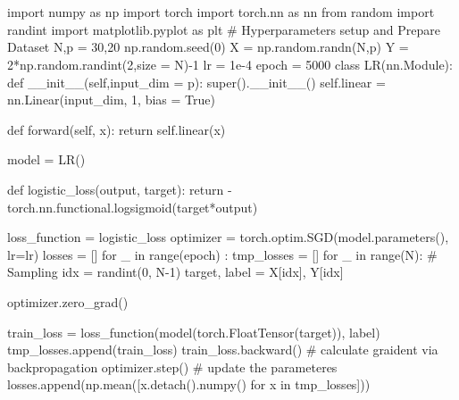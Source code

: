 \documentclass[10pt]{article}
\begin{document}
\section{}
\begin{python}
import numpy as np
import torch
import torch.nn as nn
from random import randint
import matplotlib.pyplot as plt
# Hyperparameters setup and Prepare Dataset
N,p = 30,20
np.random.seed(0)
X = np.random.randn(N,p)
Y = 2*np.random.randint(2,size = N)-1
lr = 1e-4
epoch = 5000
class LR(nn.Module):
    def __init__(self,input_dim = p):
        super().__init__()
        self.linear = nn.Linear(input_dim, 1, bias = True)
    
    def forward(self, x):
        return self.linear(x)

model = LR()

def logistic_loss(output, target):
    return -torch.nn.functional.logsigmoid(target*output)

loss_function = logistic_loss                                                   
optimizer = torch.optim.SGD(model.parameters(), lr=lr) 
losses = []
for _ in range(epoch) :
    tmp_losses = []
    for _ in range(N):
        # Sampling
        idx = randint(0, N-1)
        target, label = X[idx], Y[idx]

        optimizer.zero_grad()

        train_loss = loss_function(model(torch.FloatTensor(target)), label)
        tmp_losses.append(train_loss)
        train_loss.backward() # calculate graident via backpropagation
        optimizer.step() # update the parameteres
    losses.append(np.mean([x.detach().numpy() for x in tmp_losses]))
    
\end{python}
\end{document}

